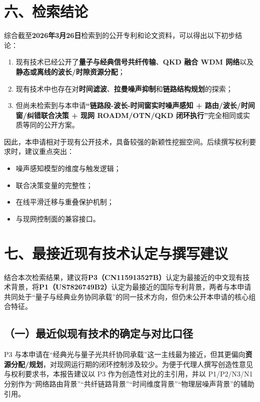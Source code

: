 \documentclass[12pt,a4paper]{article}
\begin{document}
\section*{六、检索结论}

综合截至\textbf{2026年3月26日}检索到的公开专利和论文资料，可以得出以下初步结论：
\begin{enumerate}[label=(\arabic*)]
    \item 现有技术已经公开了\textbf{量子与经典信号共纤传输}、\textbf{QKD 融合 WDM 网络}以及\textbf{静态或离线的波长/时隙资源分配}；
    \item 现有技术中也存在对\textbf{时间滤波}、\textbf{拉曼噪声抑制}和\textbf{链路结构规划}的探索；
    \item 但尚未检索到与本申请\textbf{“链路段-波长-时间窗实时噪声感知 + 路由/波长/时间窗/纠错联合决策 + 现网 ROADM/OTN/QKD 闭环执行”}完全相同或实质等同的公开方案。
\end{enumerate}

因此，本申请相对于现有公开技术，具备较强的新颖性挖掘空间。后续撰写权利要求时，建议重点突出：
\begin{itemize}[leftmargin=2em]
    \item 噪声感知模型的维度与触发逻辑；
    \item 联合决策变量的完整性；
    \item 在线平滑迁移与重叠保护机制；
    \item 与现网控制面的兼容接口。
\end{itemize}

\section*{七、最接近现有技术认定与撰写建议}

结合本次检索结果，建议将\textbf{P3（CN115913527B）}认定为最接近的中文现有技术背景，将\textbf{P1（US7826749B2）}认定为最接近的国际专利背景，两者与本申请共同处于“量子与经典业务协同承载”的同一技术方向，但仍未公开本申请的核心组合特征。

\subsection*{（一）最近似现有技术的确定与对比口径}

P3 与本申请在“经典光与量子光共纤协同承载”这一主线最为接近，但其更偏向\textbf{资源分配/规划}，对现网运行期的闭环控制涉及较少。为便于代理人撰写创造性意见与权利要求书，本报告建议以 P3 作为创造性对比的主引用，并以 P1/P2/N3/N1 分别作为“网络路由背景”“共纤链路背景”“时间维度背景”“物理层噪声背景”的辅助引用。
\end{document}
